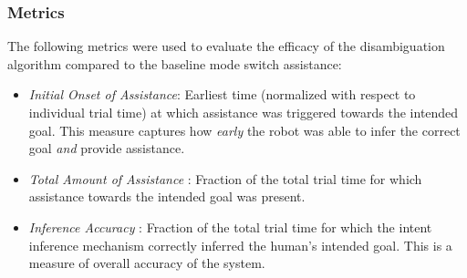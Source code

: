 \documentclass[letterpaper, 10 pt, conference]{ieeeconf}  %
\begin{document}
\subsubsection{Metrics}
The following metrics were used to evaluate the efficacy of the disambiguation algorithm compared to the baseline mode switch assistance:
\begin{itemize}
	\item \textit{Initial Onset of Assistance}: Earliest time (normalized with respect to individual trial time) at which assistance  was triggered towards the intended goal. This measure captures how \textit{early} the robot was able to infer the correct goal  \textit{and} provide assistance. 
	\item \textit{Total Amount of Assistance }: Fraction of the total trial time for which assistance towards the intended goal was present.  
	\item \textit{Inference Accuracy }: Fraction of the total trial time for which the intent inference mechanism correctly inferred the human's intended goal. This is a measure of overall accuracy of the system. 
\end{itemize}
\end{document}
